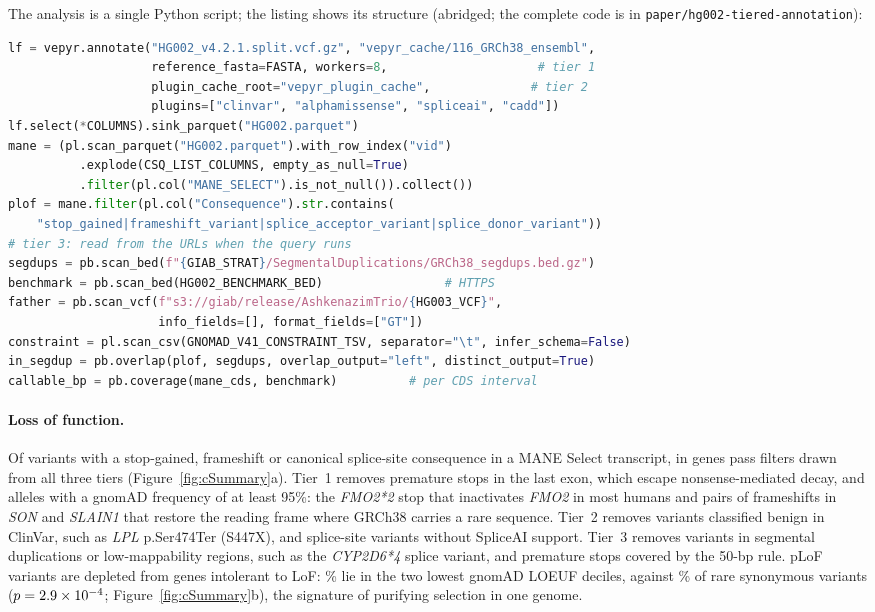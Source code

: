 The analysis is a single Python script; the listing shows its structure
(abridged; the complete code is in \texttt{paper/hg002-tiered-annotation}):
\begin{lstlisting}[language=Python]
lf = vepyr.annotate("HG002_v4.2.1.split.vcf.gz", "vepyr_cache/116_GRCh38_ensembl",
                    reference_fasta=FASTA, workers=8,                     # tier 1
                    plugin_cache_root="vepyr_plugin_cache",              # tier 2
                    plugins=["clinvar", "alphamissense", "spliceai", "cadd"])
lf.select(*COLUMNS).sink_parquet("HG002.parquet")
mane = (pl.scan_parquet("HG002.parquet").with_row_index("vid")
          .explode(CSQ_LIST_COLUMNS, empty_as_null=True)
          .filter(pl.col("MANE_SELECT").is_not_null()).collect())
plof = mane.filter(pl.col("Consequence").str.contains(
    "stop_gained|frameshift_variant|splice_acceptor_variant|splice_donor_variant"))
# tier 3: read from the URLs when the query runs
segdups = pb.scan_bed(f"{GIAB_STRAT}/SegmentalDuplications/GRCh38_segdups.bed.gz")
benchmark = pb.scan_bed(HG002_BENCHMARK_BED)                 # HTTPS
father = pb.scan_vcf(f"s3://giab/release/AshkenazimTrio/{HG003_VCF}",
                     info_fields=[], format_fields=["GT"])
constraint = pl.scan_csv(GNOMAD_V41_CONSTRAINT_TSV, separator="\t", infer_schema=False)
in_segdup = pb.overlap(plof, segdups, overlap_output="left", distinct_output=True)
callable_bp = pb.coverage(mane_cds, benchmark)          # per CDS interval
\end{lstlisting}

\paragraph{Loss of function.} Of \NPlof{} variants with a stop-gained,
frameshift or canonical splice-site consequence in a MANE Select
transcript, \NHc{} in \NHcGenes{} genes pass filters drawn from all three
tiers (Figure~\ref{fig:cSummary}a). Tier~1 removes premature stops in the
last exon, which escape nonsense-mediated decay, and alleles with a gnomAD
frequency of at least 95\%: the \textit{FMO2*2} stop that inactivates
\textit{FMO2} in most humans and pairs of frameshifts in \textit{SON} and
\textit{SLAIN1} that restore the reading frame where GRCh38 carries a rare
sequence. Tier~2 removes variants classified benign in ClinVar, such as
\textit{LPL} p.Ser474Ter (S447X), and splice-site variants without SpliceAI
support. Tier~3 removes variants in segmental duplications or
low-mappability regions, such as the \textit{CYP2D6*4} splice variant, and
premature stops covered by the 50-bp rule. pLoF variants are depleted from
genes intolerant to LoF: \LoeufAllPlofPct\% lie in the two lowest gnomAD
LOEUF deciles, against \LoeufSynPct\% of rare synonymous variants
($p=2.9\times10^{-4}$; Figure~\ref{fig:cSummary}b), the signature of
purifying selection in one genome.

